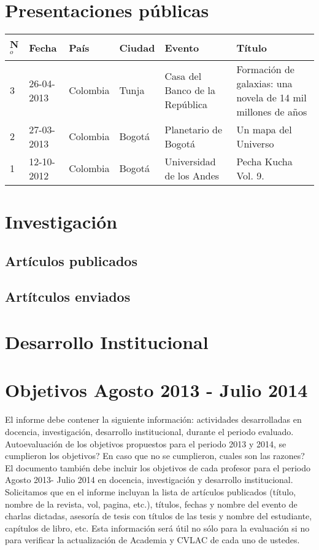 \documentclass{article}
\begin{document}
\section*{Presentaciones p\'ublicas}

\begin{tabular}{lp{2.0cm} p{1.2cm} p{1.5cm} p{2cm} p{5cm}}\hline
N$^{o}$ & Fecha & Pa\'is & Ciudad & Evento & T\'itulo\\\hline
3 & 26-04-2013 & Colombia & Tunja & Casa del Banco de la Rep\'ublica &
Formaci\'on de galaxias: una novela de 14 mil millones de a\~nos\\  
2 & 27-03-2013 & Colombia & Bogot\'a & Planetario de Bogot\'a & Un mapa del
Universo\\
1 & 12-10-2012 & Colombia & Bogot\'a & Universidad de los Andes & Pecha
Kucha Vol. 9.\\ \hline
\end{tabular}

\section*{Investigaci\'on}

\subsection*{Art\'iculos publicados}
\subsection*{Art\'itculos enviados}


\section*{Desarrollo Institucional}


\section*{Objetivos Agosto 2013 - Julio 2014}
El informe debe contener la siguiente información: actividades desarrolladas en docencia, 
investigación, desarrollo institucional, durante el periodo evaluado.  Autoevaluación de los objetivos 
propuestos para el periodo 2013 y 2014, se cumplieron los objetivos? En caso que no se cumplieron, 
cuales son las razones? El documento también debe incluir los objetivos de cada profesor para el 
periodo Agosto 2013- Julio 2014 en docencia, investigación y desarrollo institucional. Solicitamos que 
en el informe incluyan la lista de artículos publicados (título, nombre de la revista, vol, pagina, 
etc.), títulos, fechas y nombre del evento de charlas dictadas, asesoría de tesis con títulos de las 
tesis y nombre del estudiante, capítulos de libro, etc. Esta información será útil no sólo para la 
evaluación si no para verificar la actualización de Academia y CVLAC de cada uno de ustedes.
\end{document}
